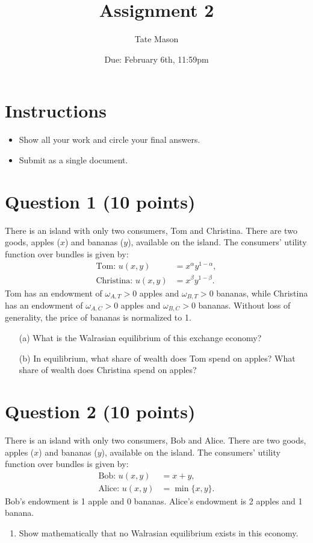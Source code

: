 \documentclass[10pt,a4paper]{article}
\begin{document}
\title{Assignment 2}
\author{Tate Mason}
\date{Due: February 6th, 11:59pm}
\maketitle

\section*{Instructions}
\begin{itemize}
    \item Show all your work and circle your final answers.
    \item Submit as a single document.
\end{itemize}

\section*{Question 1 (10 points)}
There is an island with only two consumers, Tom and Christina. There are two goods, apples ($x$) and bananas ($y$), available on the island. The consumers' utility function over bundles is given by:
\begin{align*}
    \text{Tom: } u(x, y) &= x^\alpha y^{1-\alpha}, \\
    \text{Christina: } u(x, y) &= x^\beta y^{1-\beta}.
\end{align*}
Tom has an endowment of $\omega_{A,T} > 0$ apples and $\omega_{B,T} > 0$ bananas, while Christina has an endowment of $\omega_{A,C} > 0$ apples and $\omega_{B,C} > 0$ bananas. Without loss of generality, the price of bananas is normalized to 1.
\begin{enumerate}
    \item[(a)] What is the Walrasian equilibrium of this exchange economy?
    \item[(b)] In equilibrium, what share of wealth does Tom spend on apples? What share of wealth does Christina spend on apples?
\end{enumerate}

\section*{Question 2 (10 points)}
There is an island with only two consumers, Bob and Alice. There are two goods, apples ($x$) and bananas ($y$), available on the island. The consumers' utility function over bundles is given by:
\begin{align*}
    \text{Bob: } u(x, y) &= x + y, \\
    \text{Alice: } u(x, y) &= \min \{x, y\}.
\end{align*}
Bob's endowment is 1 apple and 0 bananas. Alice's endowment is 2 apples and 1 banana.
\begin{enumerate}
    \item Show mathematically that no Walrasian equilibrium exists in this economy.
\end{enumerate}
\end{document}
